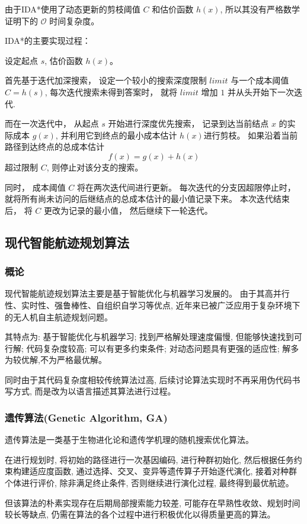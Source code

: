 \documentclass[12pt,a4paper,oneside,UTF8]{ctexart}
\begin{document}
由于IDA*使用了动态更新的剪枝阈值 $C$ 和估价函数 $h(x)$,
所以其没有严格数学证明下的 $\mathcal{O}$ 时间复杂度。

IDA*的主要实现过程：

设定起点 $s$,
估价函数 $h(x)$。

首先基于迭代加深搜索，
设定一个较小的搜索深度限制 $limit$ 与一个成本阈值 $C = h(s)$,
每次迭代搜索未得到答案时，
就将 $limit$ 增加 $1$ 并从头开始下一次迭代.

而在一次迭代中，
从起点 $s$ 开始进行深度优先搜索，
记录到达当前结点 $x$ 的实际成本 $g(x)$,
并利用它到终点的最小成本估计 $h(x)$进行剪枝。
如果沿着当前路径到达终点的总成本估计 
\[
  f(x) = g(x) +  h(x)
\]
超过限制 $C$,
则停止对该分支的搜索。

同时，
成本阈值 $C$ 将在两次迭代间进行更新。
每次迭代的分支因超限停止时，
就将所有尚未访问的后继结点的总成本估计的最小值记录下来。
本次迭代结束后，
将 $C$ 更改为记录的最小值，
然后继续下一轮迭代。

\subsection{现代智能航迹规划算法}
\subsubsection{概论}
现代智能航迹规划算法主要是基于智能优化与机器学习发展的。
由于其高并行性、实时性、强鲁棒性、自组织自学习等优点,
近年来已被广泛应用于复杂环境下的无人机自主航迹规划问题\textsuperscript{\cite{ref6}\cite{ref7}}。

其特点为:
基于智能优化与机器学习;
找到严格解处理速度偏慢,
但能够快速找到可行解;
代码复杂度较高;
可以有更多约束条件;
对动态问题具有更强的适应性;
解多为较优解,不为严格最优解。

同时由于其代码复杂度相较传统算法过高,
后续讨论算法实现时不再采用伪代码书写方式,
而是改为以语言描述其算法进行过程。
\subsubsection{遗传算法(Genetic Algorithm, GA)}
遗传算法是一类基于生物进化论和遗传学机理的随机搜索优化算法。

在进行规划时,
将初始的路径进行一次基因编码,
进行种群初始化,
然后根据任务约束构建适应度函数,
通过选择、交叉、变异等遗传算子开始逐代演化,
接着对种群个体进行评价,
除非满足终止条件,
否则继续进行演化过程,
最终得到最优航迹\textsuperscript{\cite{ref8}}。

但该算法的朴素实现存在后期局部搜索能力较差,
可能存在早熟性收敛、规划时间较长等缺点,
仍需在算法的各个过程中进行积极优化以得质量更高的算法。
\end{document}
